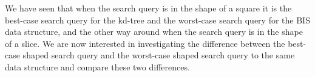 We have seen that when the search query is in the shape of a square it is the best-case search query for the kd-tree and the worst-case search query for the BIS data structure, and the other way around when the search query is in the shape of a slice. We are now interested in investigating the difference between the best-case shaped search query and the worst-case shaped search query to the same data structure and compare these two differences.

\begin{figure}[h]
\end{figure}
